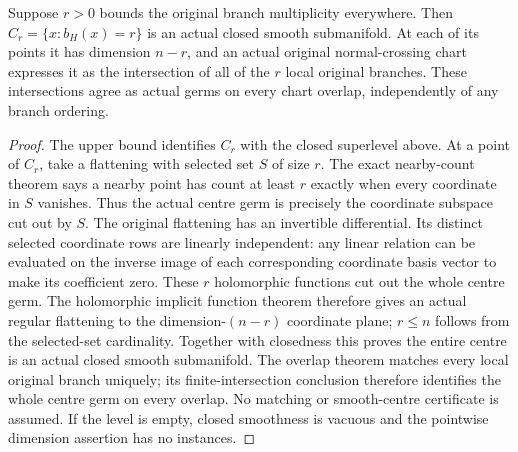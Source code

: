 \begin{theorem}
\label{hir:general-nc-highest-multiplicity-smooth-centre}
\leanok
Suppose $r>0$ bounds the original branch multiplicity everywhere.
Then $C_r=\{x:b_H(x)=r\}$ is an actual closed smooth submanifold.
At each of its points it has dimension $n-r$, and an actual original
normal-crossing chart expresses it as the intersection of all of the
$r$ local original branches. These intersections agree as actual
germs on every chart overlap, independently of any branch ordering.
\end{theorem}
\begin{proof}
The upper bound identifies $C_r$ with the closed superlevel above.
At a point of $C_r$, take a flattening with selected set $S$ of size
$r$. The exact nearby-count theorem says a nearby point has count
at least $r$ exactly when every coordinate in $S$ vanishes. Thus the
actual centre germ is precisely the coordinate subspace cut out by
$S$. The original flattening has an invertible differential. Its distinct
selected coordinate rows are linearly independent: any linear relation
can be evaluated on the inverse image of each corresponding coordinate
basis vector to make its coefficient zero. These $r$ holomorphic
functions cut out the whole centre germ. The holomorphic implicit
function theorem therefore gives an actual regular flattening to the
dimension-$(n-r)$ coordinate plane; $r\le n$ follows from the
selected-set cardinality. Together with closedness this proves
the entire centre is an actual closed smooth submanifold.
The overlap theorem matches every local original branch uniquely;
its finite-intersection conclusion therefore identifies the whole
centre germ on every overlap. No matching or smooth-centre
certificate is assumed. If the level is empty, closed smoothness is
vacuous and the pointwise dimension assertion has no instances.
\end{proof}

